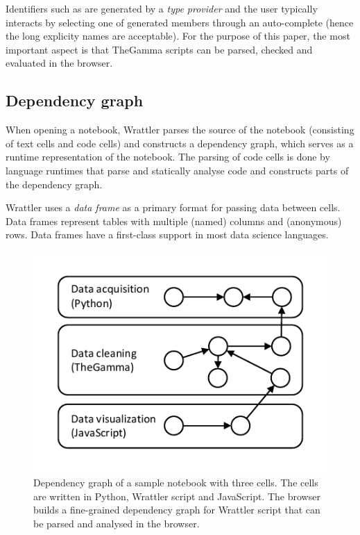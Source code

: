 \documentclass[sigplan]{acmart}\settopmatter{printfolios=true,printccs=false,printacmref=false}
\begin{document}
\noindent
Identifiers such as  are generated by a \emph{type provider} \cite{providers} 
and the user typically interacts by selecting one of generated members through an auto-complete
(hence the long explicity names are acceptable). For the purpose of this paper, the most 
important aspect is that TheGamma scripts can be parsed, checked and evaluated in the browser.

\subsection{Dependency graph}
\label{sec:comp-deps}

When opening a notebook, Wrattler parses the source of the notebook (consisting of text cells and
code cells) and constructs a dependency graph, which serves as a runtime representation of the
notebook. The parsing of code cells is done by language runtimes that parse and statically analyse 
code and constructs parts of the dependency graph.

Wrattler uses a \emph{data frame} as a primary format for passing data between cells.
Data frames represent tables with multiple (named) columns and (anonymous) rows. Data frames
have a first-class support in most data science languages.

\begin{figure}
\vspace{-0.5em}
\includegraphics[scale=1,trim=0.5cm 0.5cm 0.5cm 0.5cm]{graph.pdf}
\vspace{-0.5em}
\caption{\small{Dependency graph of a sample notebook with three cells. The cells are written
in Python, Wrattler script and JavaScript. The browser builds a fine-grained dependency graph
for Wrattler script that can be parsed and analysed in the browser.}}
\label{fig:deps}
\vspace{-1em}
\end{figure}
\end{document}
